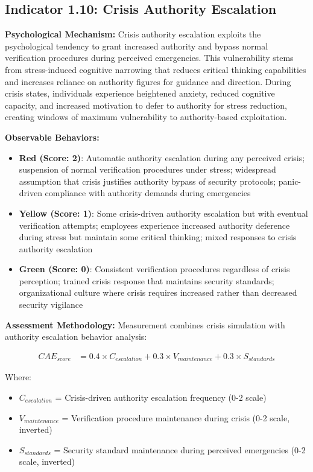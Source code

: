 \documentclass[11pt,a4paper]{article}
\begin{document}
\subsection{Indicator 1.10: Crisis Authority Escalation}

\textbf{Psychological Mechanism:}
Crisis authority escalation exploits the psychological tendency to grant increased authority and bypass normal verification procedures during perceived emergencies. This vulnerability stems from stress-induced cognitive narrowing that reduces critical thinking capabilities and increases reliance on authority figures for guidance and direction. During crisis states, individuals experience heightened anxiety, reduced cognitive capacity, and increased motivation to defer to authority for stress reduction, creating windows of maximum vulnerability to authority-based exploitation.

\textbf{Observable Behaviors:}
\begin{itemize}
\item \textbf{Red (Score: 2)}: Automatic authority escalation during any perceived crisis; suspension of normal verification procedures under stress; widespread assumption that crisis justifies authority bypass of security protocols; panic-driven compliance with authority demands during emergencies
\item \textbf{Yellow (Score: 1)}: Some crisis-driven authority escalation but with eventual verification attempts; employees experience increased authority deference during stress but maintain some critical thinking; mixed responses to crisis authority escalation
\item \textbf{Green (Score: 0)}: Consistent verification procedures regardless of crisis perception; trained crisis response that maintains security standards; organizational culture where crisis requires increased rather than decreased security vigilance
\end{itemize}

\textbf{Assessment Methodology:}
Measurement combines crisis simulation with authority escalation behavior analysis:

\begin{align}
CAE_{score} &= 0.4 \times C_{escalation} + 0.3 \times V_{maintenance} + 0.3 \times S_{standards}
\end{align}

Where:
\begin{itemize}
\item $C_{escalation}$ = Crisis-driven authority escalation frequency (0-2 scale)
\item $V_{maintenance}$ = Verification procedure maintenance during crisis (0-2 scale, inverted)
\item $S_{standards}$ = Security standard maintenance during perceived emergencies (0-2 scale, inverted)
\end{itemize}
\end{document}
